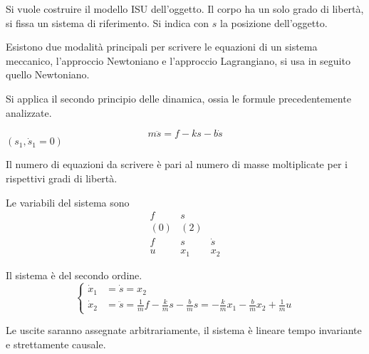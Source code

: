Si vuole costruire il modello ISU dell'oggetto.
Il corpo ha un solo grado di libertà, si fissa un sistema di riferimento.
Si indica con $s$ la posizione dell'oggetto.

Esistono due modalità principali per scrivere le equazioni di un sistema
meccanico, l'approccio Newtoniano e l'approccio Lagrangiano, si usa in seguito
quello Newtoniano.

Si applica il secondo principio delle dinamica, ossia le formule
precedentemente analizzate.

$$
m\ddot{s} = f - ks - b\dot{s}
$$
$(s_1 , \dot{s}_1 = 0)$

Il numero di equazioni da scrivere è pari al numero di masse moltiplicate per i
rispettivi gradi di libertà.

Le variabili del sistema sono
$$\begin{matrix}
f & s \\
(0) & (2) \\
f & s & \dot{s}\\
u & x_1 &x_2
\end{matrix}$$

Il sistema è del secondo ordine.
$$\left\{\begin{aligned}
\dot{x}_1 &= \dot{s} = x_2 \\
\dot{x}_2 &= \ddot{s} = \frac{1}{m}f - \frac{k}{m}s - \frac{b}{m}s =
-\frac{k}{m}x_1 - \frac{b}{m}x_2 + \frac{1}{m}u
\end{aligned}\right.$$

Le uscite saranno assegnate arbitrariamente, il sistema è lineare
tempo invariante e strettamente causale.












